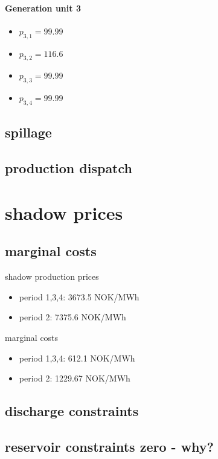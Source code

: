 \documentclass{article}
\begin{document}
\paragraph{Generation unit 3}
\begin{itemize}
\item $p_{3,1}=99.99$
\item $p_{3,2}=116.6$
\item $p_{3,3}=99.99$
\item $p_{3,4}=99.99$
\end{itemize}
\subsection{spillage}

\subsection{production dispatch}

\section{shadow prices}
\subsection{marginal costs}
shadow production prices
\begin{itemize}
\item period 1,3,4: 3673.5 NOK/MWh
\item period 2: 7375.6 NOK/MWh
\end{itemize}
marginal costs
\begin{itemize}
\item period 1,3,4: 612.1 NOK/MWh
\item period 2: 1229.67 NOK/MWh
\end{itemize}
\subsection{discharge constraints}

\subsection{reservoir constraints zero - why?}
\end{document}
